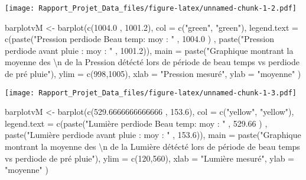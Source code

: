 \documentclass[
]{article}
\newenvironment{Shaded}{\begin{snugshade}}{\end{snugshade}}
\newcommand{\AttributeTok}[1]{\textcolor[rgb]{0.77,0.63,0.00}{#1}}
\newcommand{\DecValTok}[1]{\textcolor[rgb]{0.00,0.00,0.81}{#1}}
\newcommand{\FloatTok}[1]{\textcolor[rgb]{0.00,0.00,0.81}{#1}}
\newcommand{\FunctionTok}[1]{\textcolor[rgb]{0.00,0.00,0.00}{#1}}
\newcommand{\NormalTok}[1]{#1}
\newcommand{\OtherTok}[1]{\textcolor[rgb]{0.56,0.35,0.01}{#1}}
\newcommand{\SpecialCharTok}[1]{\textcolor[rgb]{0.00,0.00,0.00}{#1}}
\newcommand{\StringTok}[1]{\textcolor[rgb]{0.31,0.60,0.02}{#1}}
\begin{document}
\texttt{[image: Rapport\_Projet\_Data\_files/figure-latex/unnamed-chunk-1-2.pdf]}

\begin{Shaded}
\begin{Highlighting}[]
\NormalTok{barplotvM }\OtherTok{\textless{}{-}} \FunctionTok{barplot}\NormalTok{(}\FunctionTok{c}\NormalTok{(}\FloatTok{1004.0}\NormalTok{ , }\FloatTok{1001.2}\NormalTok{),}
                       \AttributeTok{col =} \FunctionTok{c}\NormalTok{(}\StringTok{"green"}\NormalTok{, }\StringTok{"green"}\NormalTok{),}
                       \AttributeTok{legend.text =} \FunctionTok{c}\NormalTok{(}\FunctionTok{paste}\NormalTok{(}\StringTok{"Pression perdiode Beau temp:  moy : "}\NormalTok{ , }\FloatTok{1004.0}\NormalTok{ ) ,}
                                       \FunctionTok{paste}\NormalTok{(}\StringTok{"Pression perdiode avant pluie  :  moy : "}\NormalTok{ , }\FloatTok{1001.2}\NormalTok{)),}
                       \AttributeTok{main =} \FunctionTok{paste}\NormalTok{(}\StringTok{"Graphique montrant la moyenne des }\SpecialCharTok{\textbackslash{}n}\StringTok{ de la Pression détécté lors de période de beau temps vs perdiode de pré pluie"}\NormalTok{),}
                       \AttributeTok{ylim =} \FunctionTok{c}\NormalTok{(}\DecValTok{998}\NormalTok{,}\DecValTok{1005}\NormalTok{),}
                       \AttributeTok{xlab =} \StringTok{"Pression mesuré"}\NormalTok{,}
                       \AttributeTok{ylab =} \StringTok{"moyenne"}
\NormalTok{)}
\end{Highlighting}
\end{Shaded}

\texttt{[image: Rapport\_Projet\_Data\_files/figure-latex/unnamed-chunk-1-3.pdf]}

\begin{Shaded}
\begin{Highlighting}[]
\NormalTok{barplotvM }\OtherTok{\textless{}{-}} \FunctionTok{barplot}\NormalTok{(}\FunctionTok{c}\NormalTok{(}\FloatTok{529.6666666666666}\NormalTok{ , }\FloatTok{153.6}\NormalTok{),}
                       \AttributeTok{col =} \FunctionTok{c}\NormalTok{(}\StringTok{"yellow"}\NormalTok{, }\StringTok{"yellow"}\NormalTok{),}
                       \AttributeTok{legend.text =} \FunctionTok{c}\NormalTok{(}\FunctionTok{paste}\NormalTok{(}\StringTok{"Lumière perdiode Beau temp:  moy : "}\NormalTok{ , }\FloatTok{529.66}\NormalTok{ ) ,}
                                       \FunctionTok{paste}\NormalTok{(}\StringTok{"Lumière perdiode avant pluie  :  moy : "}\NormalTok{ , }\FloatTok{153.6}\NormalTok{)),}
                       \AttributeTok{main =} \FunctionTok{paste}\NormalTok{(}\StringTok{"Graphique montrant la moyenne des }\SpecialCharTok{\textbackslash{}n}\StringTok{ de la Lumière détécté lors de période de beau temps vs perdiode de pré pluie"}\NormalTok{),}
                       \AttributeTok{ylim =} \FunctionTok{c}\NormalTok{(}\DecValTok{120}\NormalTok{,}\DecValTok{560}\NormalTok{),}
                       \AttributeTok{xlab =} \StringTok{"Lumière mesuré"}\NormalTok{,}
                       \AttributeTok{ylab =} \StringTok{"moyenne"}
\NormalTok{)}
\end{Highlighting}
\end{Shaded}
\end{document}
